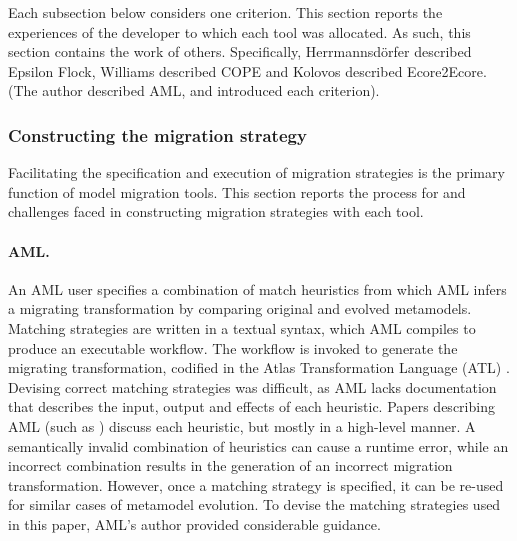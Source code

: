 Each subsection below considers one criterion. This section reports the experiences of the developer to which each tool was allocated. As such, this section contains the work of others. Specifically, Herrmannsd\"{o}rfer described Epsilon Flock, Williams described COPE and Kolovos described Ecore2Ecore. (The author described AML, and introduced each criterion). 

\subsubsection{Constructing the migration strategy}
\label{subsec:constructing}
Facilitating the specification and execution of migration strategies is the primary function of model migration tools. This section reports the process for and challenges faced in constructing migration strategies with each tool.

\paragraph{AML.} An AML user specifies a combination of match heuristics from which AML infers a migrating transformation by comparing original and evolved metamodels. Matching strategies are written in a textual syntax, which AML compiles to produce an executable workflow. The workflow is invoked to generate the migrating transformation, codified in the Atlas Transformation Language (ATL) \cite{jouault05transforming}.
%
Devising correct matching strategies was difficult, as AML lacks documentation that describes the input, output and effects of each heuristic. Papers describing AML (such as \cite{garces09managing}) discuss each heuristic, but mostly in a high-level manner. A semantically invalid combination of heuristics can cause a runtime error, while an incorrect combination results in the generation of an incorrect migration transformation. However, once a matching strategy is specified, it can be re-used for similar cases of metamodel evolution. To devise the matching strategies used in this paper, AML's author provided considerable guidance.

